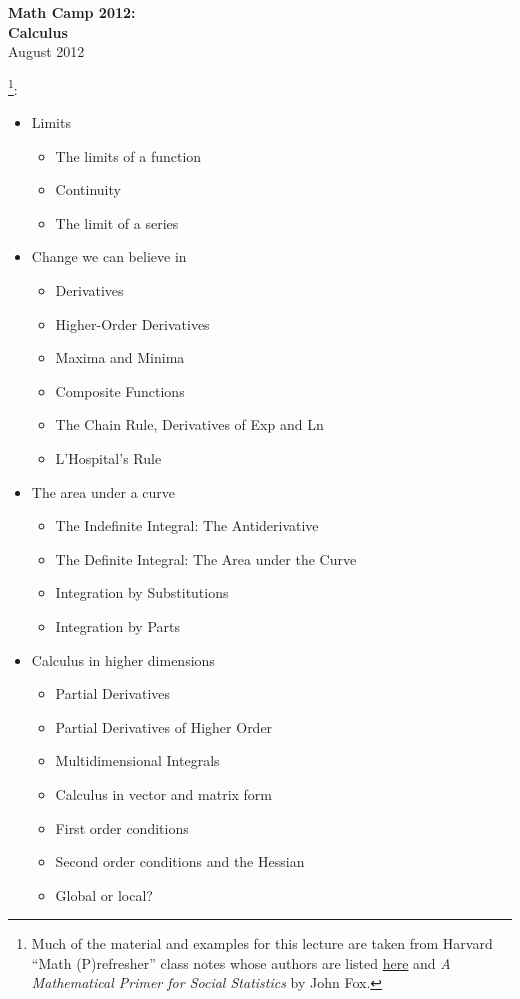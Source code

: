 \documentclass[20pt]{extarticle}
\newcommand{\bi}{\begin{itemize}}
\newcommand{\ei}{\end{itemize}}
\newcommand{\noi}{\noindent}
\begin{document}
\pagestyle{myheadings}
\parskip=6pt
\thispagestyle{empty}
\renewcommand{\thefootnote}{\fnsymbol{footnote}}

\begin{centering}
{\Large \bf Math Camp 2012:\\[9pt]
 Calculus}\\[18pt]
August 2012\\[36pt]
\end{centering}


\noi {\bf Topics}\footnote{Much of the material and examples for
this lecture are taken from Harvard ``Math (P)refresher'' class notes
whose authors are listed
\href{http://people.hmdc.harvard.edu/~mathpre/mathnotes/lectures/index.html}{here}
and \textit{A Mathematical Primer for Social Statistics} by John Fox.}:
\bi
\item Limits
\bi
\item The limits of a function
\item Continuity
\item The limit of a series
\ei
\item Change we can believe in
\bi
\item Derivatives 
\item Higher-Order Derivatives 
\item  Maxima and Minima 
\item  Composite Functions 
\item  The Chain Rule,  Derivatives of Exp and Ln 
\item  L'Hospital's Rule
\ei
\item The area under a curve
\bi
\item The Indefinite Integral: The Antiderivative 
\item The Definite Integral: The Area under the Curve 
\item Integration by Substitutions 
\item Integration by Parts
\ei
\item Calculus in higher dimensions
\bi
\item Partial Derivatives
\item Partial Derivatives of Higher Order
\item Multidimensional Integrals
\item Calculus in vector and matrix form
\item First order conditions
\item Second order conditions and the Hessian
\item Global or local?
\ei
\ei
\end{document}
